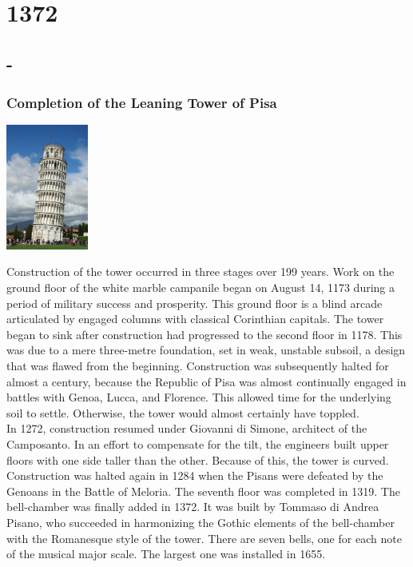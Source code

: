 \documentclass[11pt]{report}
\begin{document}
\chapter{1372}
\section{-}
\subsection{Completion of the Leaning Tower of Pisa}
\vspace{2mm}\begin{center}\includegraphics[width=2.7cm]{./img/towerOfPisa.jpeg}\end{center}
Construction of the tower occurred in three stages over 199 years. Work on the ground floor of the white marble campanile began on August 14, 1173 during a period of military success and prosperity. This ground floor is a blind arcade articulated by engaged columns with classical Corinthian capitals. The tower began to sink after construction had progressed to the second floor in 1178. This was due to a mere three-metre foundation, set in weak, unstable subsoil, a design that was flawed from the beginning. Construction was subsequently halted for almost a century, because the Republic of Pisa was almost continually engaged in battles with Genoa, Lucca, and Florence. This allowed time for the underlying soil to settle. Otherwise, the tower would almost certainly have toppled.\\
\indent In 1272, construction resumed under Giovanni di Simone, architect of the Camposanto. In an effort to compensate for the tilt, the engineers built upper floors with one side taller than the other. Because of this, the tower is curved. Construction was halted again in 1284 when the Pisans were defeated by the Genoans in the Battle of Meloria. The seventh floor was completed in 1319. The bell-chamber was finally added in 1372. It was built by Tommaso di Andrea Pisano, who succeeded in harmonizing the Gothic elements of the bell-chamber with the Romanesque style of the tower. There are seven bells, one for each note of the musical major scale. The largest one was installed in 1655.
\end{document}
